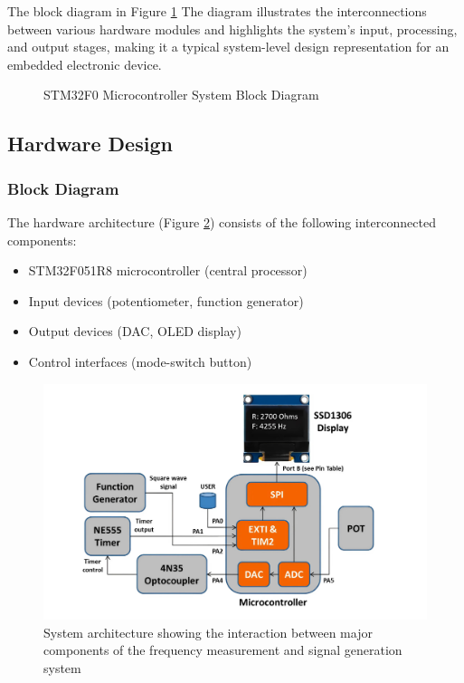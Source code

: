 \noindent[0pt] The block diagram in Figure \ref{fig:systemoverview} The diagram illustrates the interconnections between various hardware modules and highlights the system's input, processing, and output stages, making it a typical system-level design representation for an embedded electronic device.

\begin{figure}[H]
    \centering
    
    \caption{STM32F0 Microcontroller System Block Diagram}
    \label{fig:systemoverview}
\end{figure}

% 

\subsection{Hardware Design}

\subsubsection{Block Diagram}

The hardware architecture (Figure \ref{fig:systemblocks}) consists of the following interconnected components:
\begin{itemize}
    \item STM32F051R8 microcontroller (central processor)
    \item Input devices (potentiometer, function generator)
    \item Output devices (DAC, OLED display)
    \item Control interfaces (mode-switch button)
\end{itemize}

\begin{figure}[H]
    \centering
    \includegraphics[width=0.7\linewidth]{graphics/system_blocks}
    \caption{System architecture showing the interaction between major components of the frequency measurement and signal generation system \cite{lab-manual}}
    \label{fig:systemblocks}
\end{figure}

